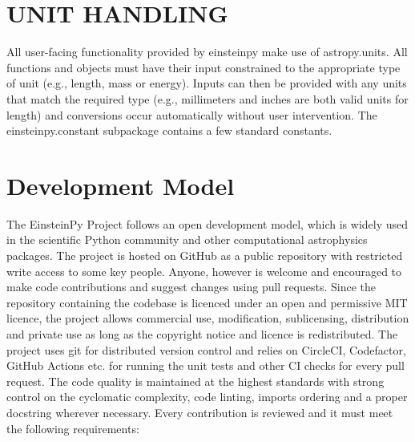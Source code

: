 \documentclass{aastex63}
\begin{document}
\section{UNIT HANDLING} \label{sec:unithandle}
All user-facing functionality provided by einsteinpy make use of astropy.units. 
All functions and objects must have their input constrained to the appropriate type of unit (e.g., length, mass or energy). Inputs can then be provided with any units that match the required type (e.g., millimeters and inches are both valid units for length) and conversions occur automatically without user intervention. The einsteinpy.constant subpackage contains a few standard constants.

\section{Development Model} \label{sec:devmodels}
The EinsteinPy Project follows an open development model, which is widely used in the scientific Python community and other computational astrophysics packages. The project is hosted on GitHub as a public repository with restricted write access to some key people. Anyone, however is welcome and encouraged to make code contributions and suggest changes using pull requests. Since the repository containing the codebase is licenced under an open and permissive MIT licence,  the project allows commercial use, modification, sublicensing, distribution and private use as long as the copyright notice and licence is redistributed. The project uses git for distributed version control and relies on CircleCI, Codefactor, GitHub Actions etc. for running the unit tests and other CI checks for every pull request.
The code quality is maintained at the highest standards with strong control on the cyclomatic complexity, code linting, imports ordering and a proper docstring wherever necessary. Every contribution is reviewed and it must meet the following requirements: 
\end{document}
